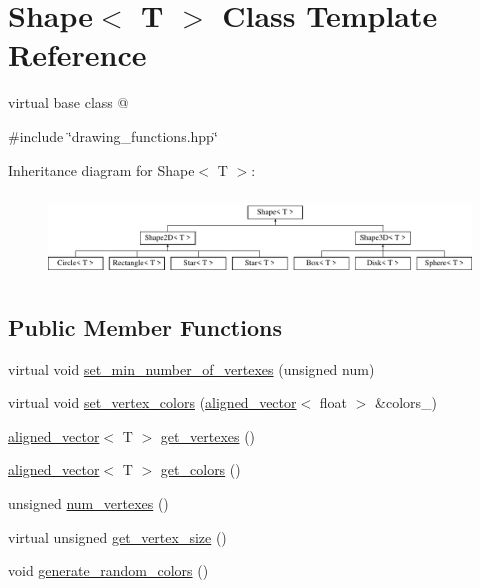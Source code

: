 \hypertarget{classShape}{}\section{Shape$<$ T $>$ Class Template Reference}
\label{classShape}


virtual base class @  




{\ttfamily \#include \char`\"{}drawing\+\_\+functions.\+hpp\char`\"{}}

Inheritance diagram for Shape$<$ T $>$\+:\begin{figure}[H]
\begin{center}
\leavevmode
\includegraphics[height=2.242991cm]{classShape}
\end{center}
\end{figure}
\subsection*{Public Member Functions}
\begin{DoxyCompactItemize}
\item 
virtual void \mbox{\hyperlink{classShape_ac5a35fe1b2ecb8fcfc050a31c8969805}{set\+\_\+min\+\_\+number\+\_\+of\+\_\+vertexes}} (unsigned num)
\item 
virtual void \mbox{\hyperlink{classShape_a69dabd50440dba1ac463ad6819cdb506}{set\+\_\+vertex\+\_\+colors}} (\mbox{\hyperlink{type__definitions_8hpp_accb98a876f193a416d9c8a02fe22d526}{aligned\+\_\+vector}}$<$ float $>$ \&colors\+\_\+)
\item 
\mbox{\hyperlink{type__definitions_8hpp_accb98a876f193a416d9c8a02fe22d526}{aligned\+\_\+vector}}$<$ T $>$ \mbox{\hyperlink{classShape_a3729bbdd0c4e4f3379498734807bb545}{get\+\_\+vertexes}} ()
\item 
\mbox{\hyperlink{type__definitions_8hpp_accb98a876f193a416d9c8a02fe22d526}{aligned\+\_\+vector}}$<$ T $>$ \mbox{\hyperlink{classShape_aabe9bd208b0ece9824cb45deccc11ba7}{get\+\_\+colors}} ()
\item 
unsigned \mbox{\hyperlink{classShape_a131e85c7f5cad85bffb92e6719117cab}{num\+\_\+vertexes}} ()
\item 
virtual unsigned \mbox{\hyperlink{classShape_a58713d8cf7c4175e7c76eae75c94bc13}{get\+\_\+vertex\+\_\+size}} ()
\item 
void \mbox{\hyperlink{classShape_aabeb601fe95b412987d5b5c276bf8a7a}{generate\+\_\+random\+\_\+colors}} ()
\end{DoxyCompactItemize}
